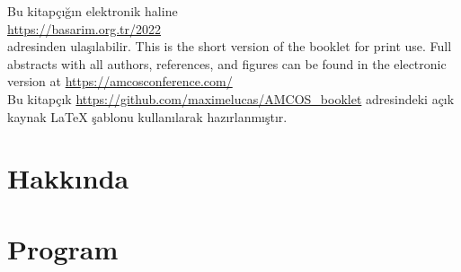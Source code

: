\documentclass[openany, parskip=full, 12pt, a4]{scrbook}
\begin{document}

	
\mbox{}
\thispagestyle{empty}
\vfill
\begin{center}
  \ifOnline
  Bu kitapçığın elektronik haline\\ \url{https://basarim.org.tr/2022}\\ adresinden ulaşılabilir. 
	\else
	This is the short version of the booklet for print use. Full abstracts with all authors, references, and figures can be found in the electronic version at \url{https://amcosconference.com/}
	\fi %
	\\[20pt] %
	Bu kitapçık \url{https://github.com/maximelucas/AMCOS\_booklet} adresindeki açık kaynak \LaTeX{} şablonu kullanılarak hazırlanmıştır. 
\end{center}

\newpage

\tableofcontents

\chapter{Hakkında}



\chapter{Program}




\end{document}
